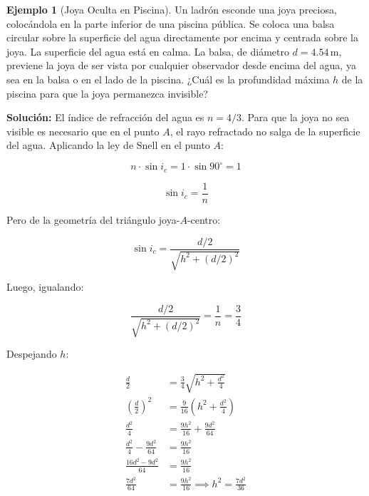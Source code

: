 \documentclass[12pt, a4paper]{article}
\theoremstyle{definition}
\newtheorem{ejemplo}{Ejemplo}[section]
\begin{document}
\begin{ejemplo}[Joya Oculta en Piscina]
Un ladrón esconde una joya preciosa, colocándola en la parte inferior de una piscina pública.
Se coloca una balsa circular sobre la superficie del agua directamente por encima y centrada
sobre la joya. La superficie del agua está en calma. La balsa, de diámetro \(d = 4.54\,\text{m}\),
previene la joya de ser vista por cualquier observador desde encima del agua, ya sea en la balsa
o en el lado de la piscina. ¿Cuál es la profundidad máxima \(h\) de la piscina para que la joya
permanezca invisible?
\end{ejemplo}

\textbf{Solución:} El índice de refracción del agua es \(n = 4/3\). Para que la joya no sea
visible es necesario que en el punto \(A\), el rayo refractado no salga de la superficie del
agua. Aplicando la ley de Snell en el punto \(A\):

\begin{equation}
  n \cdot \sin i_c = 1 \cdot \sin 90^{\circ} = 1
  \label{eq:snell_critico}
\end{equation}

\begin{equation}
  \sin i_c = \frac{1}{n}
  \label{eq:sin_ic}
\end{equation}

Pero de la geometría del triángulo joya-\(A\)-centro:

\begin{equation}
  \sin i_c = \frac{d/2}{\sqrt{h^2 + (d/2)^2}}
  \label{eq:sin_ic_geo}
\end{equation}

Luego, igualando:

\begin{equation}
  \frac{d/2}{\sqrt{h^2 + (d/2)^2}} = \frac{1}{n} = \frac{3}{4}
  \label{eq:igualando}
\end{equation}

Despejando \(h\):

\begin{align}
  \frac{d}{2} &= \frac{3}{4}\sqrt{h^2 + \frac{d^2}{4}} \nonumber \\
  \left(\frac{d}{2}\right)^2 &= \frac{9}{16}\left(h^2 + \frac{d^2}{4}\right) \nonumber \\
  \frac{d^2}{4} &= \frac{9h^2}{16} + \frac{9d^2}{64} \nonumber \\
  \frac{d^2}{4} - \frac{9d^2}{64} &= \frac{9h^2}{16} \nonumber \\
  \frac{16d^2 - 9d^2}{64} &= \frac{9h^2}{16} \nonumber \\
  \frac{7d^2}{64} &= \frac{9h^2}{16} \implies h^2 = \frac{7d^2}{36}
  \label{eq:h2}
\end{align}
\end{document}
